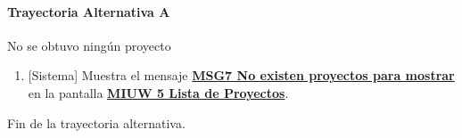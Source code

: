 \paragraph{Trayectoria Alternativa A} \label{gestion-proyectos:TA}
	No se obtuvo ningún proyecto
	\begin{enumerate}[label=A\arabic*.]
		\item {[Sistema]} Muestra el mensaje \hyperref[MSG7]{\bf MSG7 No existen proyectos para mostrar} en la pantalla \hyperref[fig:MIUW-5]{\bf MIUW 5 Lista de Proyectos}.
	\end{enumerate}
	Fin de la trayectoria alternativa.